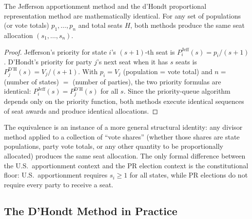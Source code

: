 \label{sec:dhondt}

\begin{theorem}
  \label{thm:dhondt-equiv}
  The Jefferson apportionment method and the d'Hondt proportional
  representation method are mathematically identical.
  For any set of populations (or vote totals) $p_1, \ldots, p_n$
  and total seats $H$, both methods produce the same seat allocation
  $(s_1, \ldots, s_n)$.
\end{theorem}

\begin{proof}
  Jefferson's priority for state $i$'s $(s+1)$-th seat is
  $P_i^{\text{Jeff}}(s) = p_i/(s+1)$.
  D'Hondt's priority for party $j$'s next seat when it has $s$ seats is
  $P_j^{\text{D'H}}(s) = V_j/(s+1)$.
  With $p_i = V_j$ (population = vote total) and $n = $ (number of
  states) $= $ (number of parties), the two priority formulas are
  identical: $P_i^{\text{Jeff}}(s) = P_j^{\text{D'H}}(s)$ for all $s$.
  Since the priority-queue algorithm depends only on the priority
  function, both methods execute identical sequences of seat awards
  and produce identical allocations.
\end{proof}

The equivalence is an instance of a more general structural identity:
any divisor method applied to a collection of ``vote shares''
(whether those shares are state populations, party vote totals,
or any other quantity to be proportionally allocated) produces
the same seat allocation.
The only formal difference between the U.S.\ apportionment context
and the PR election context is the constitutional floor:
U.S.\ apportionment requires $s_i \geq 1$ for all states, while
PR elections do not require every party to receive a seat.

\subsection{The D'Hondt Method in Practice}

